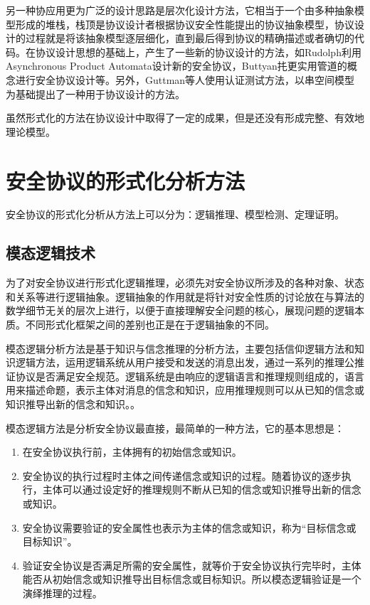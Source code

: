 \documentclass[cs4size,a4pape,UTF8]{ctexart}
\numberwithin{equation}{section}
\numberwithin{table}{section}
\numberwithin{figure}{section}
\begin{document}
另一种协应用更为广泛的设计思路是层次化设计方法，它相当于一个由多种抽象模型形成的堆栈，栈顶是协议设计者根据协议安全性能提出的协议抽象模型，协议设计的过程就是将该抽象模型逐层细化，直到最后得到协议的精确描述或者确切的代码。在协议设计思想的基础上，产生了一些新的协议设计的方法，如Rudolph利用Asynchronous Product Automata设计新的安全协议，Buttyan扥更实用管道的概念进行安全协议设计等。另外，Guttman等人使用认证测试方法，以串空间模型为基础提出了一种用于协议设计的方法。

虽然形式化的方法在协议设计中取得了一定的成果，但是还没有形成完整、有效地理论模型。
\newpage
\section{安全协议的形式化分析方法}
安全协议的形式化分析从方法上可以分为：逻辑推理、模型检测、定理证明。

\subsection{模态逻辑技术}
为了对安全协议进行形式化逻辑推理，必须先对安全协议所涉及的各种对象、状态和关系等进行逻辑抽象。逻辑抽象的作用就是将针对安全性质的讨论放在与算法的数学细节无关的层次上进行，以便于直接理解安全问题的核心，展现问题的逻辑本质。不同形式化框架之间的差别也正是在于逻辑抽象的不同\cite{book}。

模态逻辑分析方法是基于知识与信念推理的分析方法，主要包括信仰逻辑方法和知识逻辑方法，运用逻辑系统从用户接受和发送的消息出发，通过一系列的推理公推证协议是否满足安全规范。逻辑系统是由响应的逻辑语言和推理规则组成的，语言用来描述命题，表示主体对消息的信念和知识，应用推理规则可以从已知的信念或知识推导出新的信念和知识。\cite{book}\cite{2}。

模态逻辑方法是分析安全协议最直接，最简单的一种方法，它的基本思想是：

\begin{enumerate}[(1)]
\item 在安全协议执行前，主体拥有的初始信念或知识。
\item 安全协议的执行过程时主体之间传递信念或知识的过程。随着协议的逐步执行，主体可以通过设定好的推理规则不断从已知的信念或知识推导出新的信念或知识。
\item 安全协议需要验证的安全属性也表示为主体的信念或知识，称为“目标信念或目标知识”。
\item 验证安全协议是否满足所需的安全属性，就等价于安全协议执行完毕时，主体能否从初始信念或知识推导出目标信念或目标知识。所以模态逻辑验证是一个演绎推理的过程。
\end{enumerate}
\end{document}
